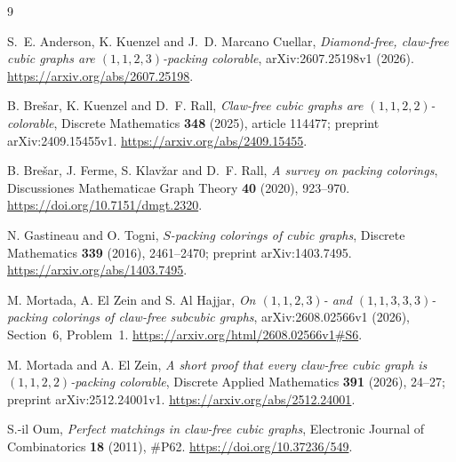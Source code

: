 \documentclass[11pt,a4paper]{article}
\theoremstyle{definition}
\theoremstyle{remark}
\begin{document}
\begin{thebibliography}{9}
\small
\raggedright

S.~E. Anderson, K. Kuenzel and J.~D. Marcano Cuellar,
\emph{Diamond-free, claw-free cubic graphs are
\((1,1,2,3)\)-packing colorable},
arXiv:2607.25198v1 (2026).
\url{https://arxiv.org/abs/2607.25198}.

B. Bre\v{s}ar, K. Kuenzel and D.~F. Rall,
\emph{Claw-free cubic graphs are \((1,1,2,2)\)-colorable},
Discrete Mathematics \textbf{348} (2025), article 114477;
preprint arXiv:2409.15455v1.
\url{https://arxiv.org/abs/2409.15455}.

B. Bre\v{s}ar, J. Ferme, S. Klav\v{z}ar and D.~F. Rall,
\emph{A survey on packing colorings},
Discussiones Mathematicae Graph Theory \textbf{40} (2020), 923--970.
\url{https://doi.org/10.7151/dmgt.2320}.

N. Gastineau and O. Togni,
\emph{\(S\)-packing colorings of cubic graphs},
Discrete Mathematics \textbf{339} (2016), 2461--2470;
preprint arXiv:1403.7495.
\url{https://arxiv.org/abs/1403.7495}.

M. Mortada, A. El Zein and S. Al Hajjar,
\emph{On \((1,1,2,3)\)- and \((1,1,3,3,3)\)-packing colorings
of claw-free subcubic graphs},
arXiv:2608.02566v1 (2026), Section~6, Problem~1.
\url{https://arxiv.org/html/2608.02566v1#S6}.

M. Mortada and A. El Zein,
\emph{A short proof that every claw-free cubic graph is
\((1,1,2,2)\)-packing colorable},
Discrete Applied Mathematics \textbf{391} (2026), 24--27;
preprint arXiv:2512.24001v1.
\url{https://arxiv.org/abs/2512.24001}.

S.-il Oum, \emph{Perfect matchings in claw-free cubic graphs},
Electronic Journal of Combinatorics \textbf{18} (2011), \#P62.
\url{https://doi.org/10.37236/549}.

\end{thebibliography}
\end{document}
